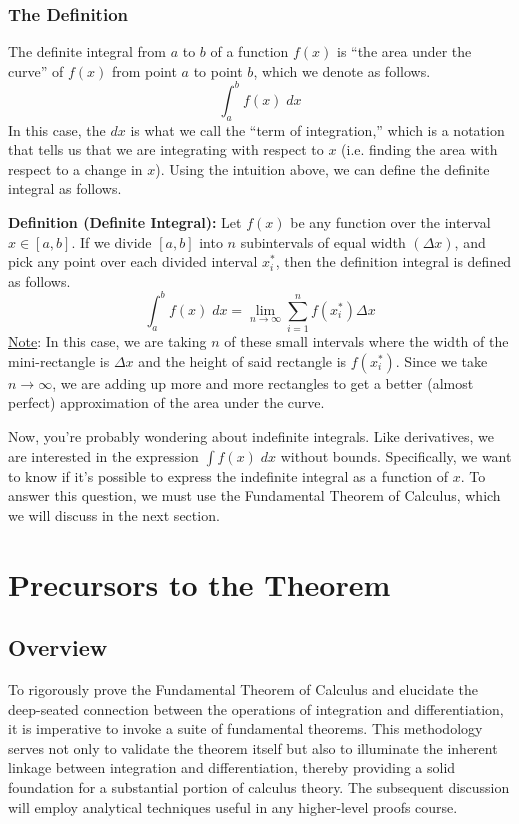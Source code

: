 \documentclass[8pt]{extarticle}
\begin{document}
\subsubsection{The Definition}
The definite integral from $a$ to $b$ of a function $f(x)$ is ``the area under the curve'' of $f(x)$ from point $a$ to point $b$, which we denote as follows.
$$
\int_a^b f(x) \;dx
$$
In this case, the $dx$ is what we call the ``term of integration,'' which is a notation that tells us that we are integrating with respect to $x$ (i.e. finding the area with respect to a change in $x$). Using the intuition above, we can define the definite integral as follows.
\begin{boxedsection}
  \textbf{Definition (Definite Integral):} Let $f(x)$ be any function over the interval $x \in [a,b]$. If we divide $[a,b]$ into $n$ subintervals of equal width $(\Delta x)$, and pick any point over each divided interval $x_i^*$, then the definition integral is defined as follows.
  $$
  \int_a^b f(x) \;dx = \lim_{n\rightarrow\infty} \sum_{i=1}^n f(x_i^*) \Delta x 
  $$
  \underline{Note}: In this case, we are taking $n$ of these small intervals where the width of the mini-rectangle is $\Delta x$ and the height of said rectangle is $f(x_i^*)$. Since we take $n \rightarrow \infty$, we are adding up more and more rectangles to get a better (almost perfect) approximation of the area under the curve.
\end{boxedsection}
Now, you're probably wondering about indefinite integrals. Like derivatives, we are interested in the expression $\int f(x)\;dx$ without bounds. Specifically, we want to know if it's possible to express the indefinite integral as a function of $x$. To answer this question, we must use the Fundamental Theorem of Calculus, which we will discuss in the next section.
\section{Precursors to the Theorem}
\subsection{Overview}
To rigorously prove the Fundamental Theorem of Calculus and elucidate the deep-seated connection between the operations of integration and differentiation, it is imperative to invoke a suite of fundamental theorems. This methodology serves not only to validate the theorem itself but also to illuminate the inherent linkage between integration and differentiation, thereby providing a solid foundation for a substantial portion of calculus theory. The subsequent discussion will employ analytical techniques useful in any higher-level proofs course.
\end{document}
